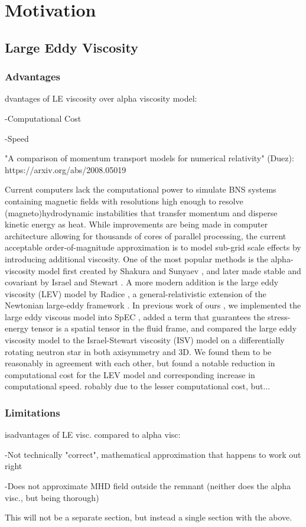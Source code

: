 \documentclass[%
twocolumn,
superscriptaddress,
nofootinbib,
 amsmath,amssymb,
 aps, prd
]{revtex4-2}
\newcommand{\alex}[1]{\color{red}{#1}}
\begin{document}
\section{Motivation}
  \subsection{Large Eddy Viscosity}
      \subsubsection{Advantages}

         {\alex 
        Advantages of LE viscosity over alpha viscosity model:

          -Computational Cost

          -Speed

          "A comparison of momentum transport models for numerical relativity" (Duez): https://arxiv.org/abs/2008.05019}

        Current computers lack the computational power to simulate BNS systems containing magnetic fields with resolutions high enough to resolve (magneto)hydrodynamic instabilities that transfer momentum and disperse kinetic energy as heat.
        While improvements are being made in computer architecture allowing for thousands of cores of parallel processing, the current acceptable order-of-magnitude approximation is to model sub-grid scale effects by introducing additional viscosity.
        One of the most popular methods is the alpha-viscosity model first created by Shakura and Sunyaev \cite{Shakura_1973}, and later made stable and covariant by Israel and Stewart \cite{Israel_1979}.
        A more modern addition is the large eddy viscosity (LEV) model by Radice \cite{Radice_2017, Radice_2018}, a general-relativistic extension of the Newtonian large-eddy framework \cite{Miesch_2015}.
        In previous work of ours \cite{Duez_2020}, we implemented the large eddy viscous model into SpEC \cite{spec}, added a term that guarantees the stress-energy tensor is a spatial tensor in the fluid frame, and compared the large eddy viscosity model to the Israel-Stewart viscosity (ISV) model on a differentially rotating neutron star in both axisymmetry and 3D.
        We found them to be reasonably in agreement with each other, but found a notable reduction in computational cost for the LEV model and corresponding increase in computational speed. 
        {\alex Probably due to the lesser computational cost, but...}


      \subsubsection{Limitations}
      {\alex
        Disadvantages of LE visc. compared to alpha visc:

          -Not technically "correct", mathematical approximation that happens to work out right

          -Does not approximate MHD field outside the remnant (neither does the alpha visc., but being thorough)

          This will not be a separate section, but instead a single section with the above.
          }
       
\end{document}
